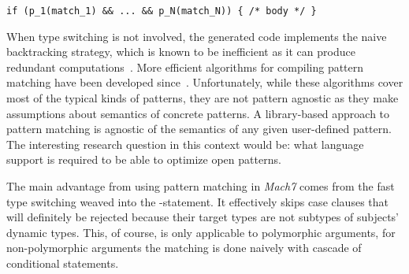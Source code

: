 \begin{lstlisting}
if (p_1(match_1) && ... && p_N(match_N)) { /* body */ }
\end{lstlisting}

\noindent
When type switching is not involved, the generated code implements the naive 
backtracking strategy, which is known to be inefficient as it can produce 
redundant computations~\cite[]{Cardelli84}. More efficient 
algorithms for compiling pattern matching have been developed 
since~\cite{Augustsson85,Maranget92,Puel93,OPM01,Maranget08}. Unfortunately, while these 
algorithms cover most of the typical kinds of patterns, they are not pattern agnostic 
as they make assumptions about semantics of concrete patterns. A library-based 
approach to pattern matching is agnostic of the semantics of any given 
user-defined pattern. The interesting research question in this context would 
be: what language support is required to be able to optimize open patterns. 

The main advantage from using pattern matching in \emph{Mach7} comes from the fast type 
switching weaved into the -statement. It effectively skips case 
clauses that will definitely be rejected because their target types are not 
subtypes of subjects' dynamic types. This, of course, is only applicable to 
polymorphic arguments, for non-polymorphic arguments the matching is done 
naively with cascade of conditional statements.
